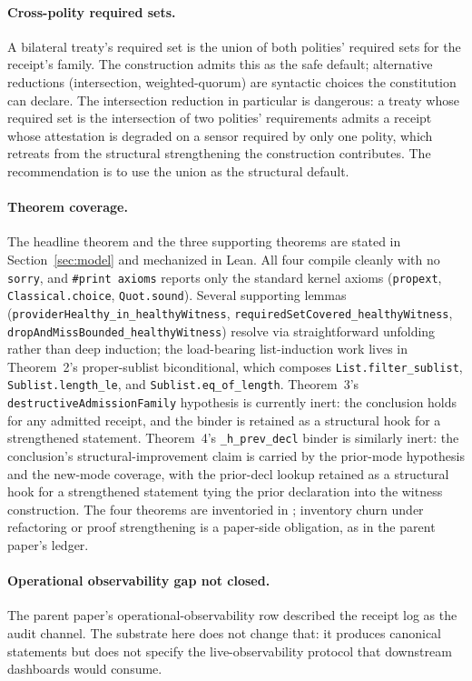 \paragraph{Cross-polity required sets.}
A bilateral treaty's required set is the union of both polities' required sets for the receipt's family. The construction admits this as the safe default; alternative reductions (intersection, weighted-quorum) are syntactic choices the constitution can declare. The intersection reduction in particular is dangerous: a treaty whose required set is the intersection of two polities' requirements admits a receipt whose attestation is degraded on a sensor required by only one polity, which retreats from the structural strengthening the construction contributes. The recommendation is to use the union as the structural default.

\paragraph{Theorem coverage.}
The headline theorem and the three supporting theorems are stated in Section~\ref{sec:model} and mechanized in Lean. All four compile cleanly with no \texttt{sorry}, and \texttt{\#print axioms} reports only the standard kernel axioms (\texttt{propext}, \texttt{Classical.choice}, \texttt{Quot.sound}). Several supporting lemmas (\texttt{providerHealthy\_in\_healthyWitness}, \texttt{requiredSetCovered\_healthyWitness}, \texttt{dropAndMissBounded\_healthyWitness}) resolve via straightforward unfolding rather than deep induction; the load-bearing list-induction work lives in Theorem~2's proper-sublist biconditional, which composes \texttt{List.filter\_sublist}, \texttt{Sublist.length\_le}, and \texttt{Sublist.eq\_of\_length}. Theorem~3's \texttt{destructiveAdmissionFamily} hypothesis is currently inert: the conclusion holds for any admitted receipt, and the binder is retained as a structural hook for a strengthened statement. Theorem~4's \texttt{\_h\_prev\_decl} binder is similarly inert: the conclusion's structural-improvement claim is carried by the prior-mode hypothesis and the new-mode coverage, with the prior-decl lookup retained as a structural hook for a strengthened statement tying the prior declaration into the witness construction. The four theorems are inventoried in ; inventory churn under refactoring or proof strengthening is a paper-side obligation, as in the parent paper's ledger.

\paragraph{Operational observability gap not closed.}
The parent paper's operational-observability row described the receipt log as the audit channel. The substrate here does not change that: it produces canonical statements but does not specify the live-observability protocol that downstream dashboards would consume.

